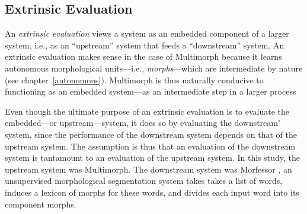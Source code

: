 {\subsection{Extrinsic Evaluation} \label{sec:eval-extrinsic} An \emph{extrinsic evaluation} 
views a system as an embedded component of a larger system, i.e., as an ``upstream'' system that feeds a ``downstream''
system. An extrinsic evaluation makes sense in the case of  Multimorph because it learns autonomous morphological units---i.e., \emph{morphs}---which are intermediate by nature (see chapter~\ref{autonomous}).
Multimorph is thus naturally conducive to functioning as an embedded system---as an intermediate step in a larger process

Even though the ultimate purpose of an extrinsic evaluation is to evaluate the embedded---or upstream---system,
it does so by evaluating the downstream' system, since the
 performance of the downstream system depends on that of the upstream system. 
 The assumption is thus that an evaluation of the downstream system is tantamount to an evaluation of the upstream system.
In this study, the upstream system was Multimorph. The downstream system was
 Morfessor
\citep{creutz:2003, creutz-and-lagus:2005, creutz-et-al:2006, creutz-and-lagus:2007}, an 
unsupervised morphological segmentation 
system takes takes a list of words, induces a lexicon of morphs 
for these words, and divides each input word into its component morphs.
}
